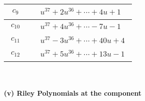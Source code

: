 \documentclass[1p]{elsarticle_modified}
\theoremstyle{definition}
\begin{document}
\begin{tabular}{m{50pt}|m{274pt}}
\hline $$\begin{aligned}c_{9}\end{aligned}$$&$\begin{aligned}
&u^{37}+2 u^{36}+\cdots+4 u+1
\end{aligned}$\\
\hline $$\begin{aligned}c_{10}\end{aligned}$$&$\begin{aligned}
&u^{37}+4 u^{36}+\cdots-7 u-1
\end{aligned}$\\
\hline $$\begin{aligned}c_{11}\end{aligned}$$&$\begin{aligned}
&u^{37}-3 u^{36}+\cdots+40 u+4
\end{aligned}$\\
\hline $$\begin{aligned}c_{12}\end{aligned}$$&$\begin{aligned}
&u^{37}+5 u^{36}+\cdots+13 u-1
\end{aligned}$\\
\hline
\end{tabular}\\~\\
\newpage\renewcommand{\arraystretch}{1}
\flushleft \textbf{(v) Riley Polynomials at the component}\newline \\
\end{document}
